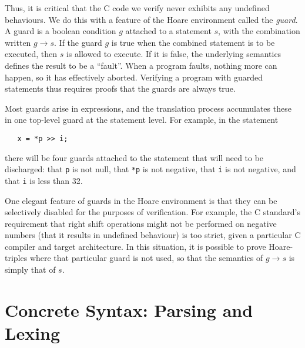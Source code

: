 \documentclass{article}
\begin{document}
Thus, it is critical that the C code we verify never exhibits any
undefined behaviours.  We do this with a feature of the Hoare
environment called the \emph{guard}.  A guard is a boolean condition
$g$ attached to a statement $s$, with the combination written $g\to
s$.  If the guard $g$ is true when the combined statement is to be
executed, then $s$ is allowed to execute.  If it is false, the
underlying semantics defines the result to be a ``fault''.  When a
program faults, nothing more can happen, so it has effectively
aborted.  Verifying a program with guarded statements thus requires
proofs that the guards are always true.

Most guards arise in expressions, and the
translation process accumulates these in one top-level guard at the
statement level.  For example, in the statement
\begin{verbatim}
   x = *p >> i;
\end{verbatim}
there will be four guards attached to the statement that will need to
be discharged: that \texttt{p} is not null, that \texttt{*p} is not
negative, that \texttt{i} is not negative, and that \texttt{i} is less
than 32.

One elegant feature of guards in the Hoare environment is that they
can be selectively disabled for the purposes of verification.  For
example, the C standard's requirement that right shift operations might not
be performed on negative numbers (that it results in undefined
behaviour) is too strict, given a particular C compiler and target
architecture.  In this situation, it is possible to prove
Hoare-triples where that particular guard is not used, so that the
semantics of $g\to s$ is simply that of $s$.



\appendix
\section{Concrete Syntax: Parsing and Lexing}
\label{sec:grammar}
\end{document}
